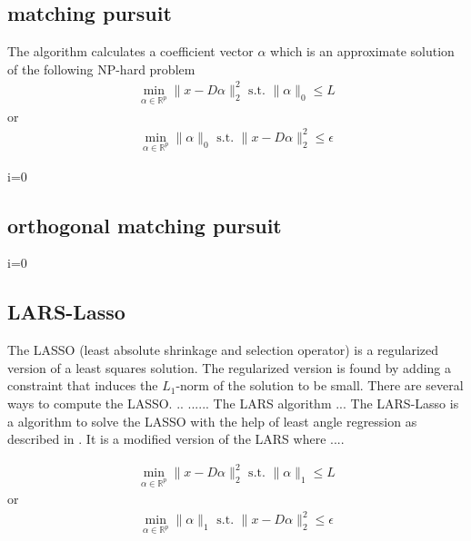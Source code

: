 \subsection{matching pursuit}
The algorithm calculates a coefficient vector $\alpha$ which is an approximate solution of the following NP-hard problem
\begin{align}
\min_{\alpha\in\mathbb{R}^{p}}  \lVert x - D\alpha \rVert^{2}_{2} \textrm{ s.t. } \lVert \alpha \rVert_{0} \leq L
\end{align}
or
\begin{align}
\min_{\alpha\in\mathbb{R}^{p}}   \lVert \alpha \rVert_{0}   \textrm{ s.t. } \lVert x - D\alpha \rVert^{2}_{2} \leq \epsilon
\end{align}
\cite{Mallat1993}
\begin{algorithm}
\begin{algorithmic}
\STATE i=0
\end{algorithmic}
\end{algorithm}

\subsection{orthogonal matching pursuit}
\cite{Pati1993}
\label{sec:omp}
\begin{algorithm}
\begin{algorithmic}
\STATE i=0
\end{algorithmic}
\end{algorithm}

\subsection{LARS-Lasso}
The LASSO (least absolute shrinkage and selection operator) is a regularized version of a least squares solution.
The regularized version is found by adding a constraint that induces the $L_1$-norm of the solution to be small.
There are several ways to compute the LASSO. .. ...... \cite{} 
The LARS algorithm ... \cite{Efron2004}
The LARS-Lasso is a algorithm to solve the LASSO with the help of least angle regression
as described in \cite{Efron2004}. It is a modified version of the LARS where ....



\begin{align}
\min_{\alpha\in\mathbb{R}^{p}}  \lVert x - D\alpha \rVert^{2}_{2} \textrm{ s.t. } \lVert \alpha \rVert_{1} \leq L
\end{align}
or
\begin{align}
\min_{\alpha\in\mathbb{R}^{p}}   \lVert \alpha \rVert_{1}   \textrm{ s.t. } \lVert x - D\alpha \rVert^{2}_{2} \leq \epsilon
\end{align}

